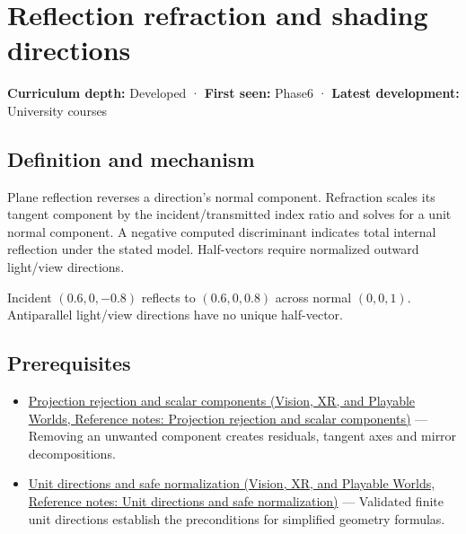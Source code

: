 \hypertarget{appendix-44e00863b4d5}{}\label{referencestart:appendix-44e00863b4d5}
\section{Reflection refraction and shading directions}\label{appendix-44e00863b4d5-reflection-refraction-and-shading-directions}

\textbf{Curriculum depth:} Developed · \textbf{First seen:} Phase6 · \textbf{Latest development:} University courses

\begin{allmightroledefinition}

\subsection{Definition and mechanism}\label{appendix-44e00863b4d5-definition-and-mechanism}

Plane reflection reverses a direction's normal component. Refraction scales its tangent component by the incident/transmitted index ratio and solves for a unit normal component. A negative computed discriminant indicates total internal reflection under the stated model. Half-vectors require normalized outward light/view directions.

\end{allmightroledefinition}

Incident \((0.6,0,-0.8)\) reflects to \((0.6,0,0.8)\) across normal \((0,0,1)\). Antiparallel light/view directions have no unique half-vector.

\subsection{Prerequisites}\label{appendix-44e00863b4d5-prerequisites}

\begin{itemize}
\tightlist
\item
  \href{../07-Vision-XR-and-Playable-Worlds/main.pdf\#nameddest=appendix-505a502c372a}{Projection rejection and scalar components (Vision, XR, and Playable Worlds, Reference notes: Projection rejection and scalar components)} --- Removing an unwanted component creates residuals, tangent axes and mirror decompositions.
\item
  \href{../07-Vision-XR-and-Playable-Worlds/main.pdf\#nameddest=appendix-f744e41b95b4}{Unit directions and safe normalization (Vision, XR, and Playable Worlds, Reference notes: Unit directions and safe normalization)} --- Validated finite unit directions establish the preconditions for simplified geometry formulas.
\end{itemize}

